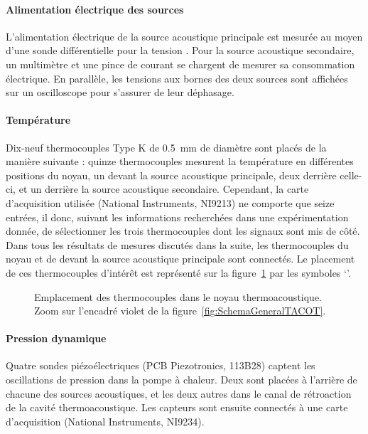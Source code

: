 \paragraph*{Alimentation électrique des sources} L'alimentation électrique de la source acoustique principale est mesurée au moyen d'une sonde différentielle pour la tension . Pour la source acoustique secondaire, un multimètre et une pince de courant se chargent de mesurer sa consommation électrique. En parallèle, les tensions aux bornes des deux sources sont affichées sur un oscilloscope pour s'assurer de leur déphasage.

\paragraph*{Température} Dix-neuf thermocouples Type K de \qty{.5}{\milli\meter} de diamètre sont placés de la manière suivante : quinze thermocouples mesurent la température en différentes positions du noyau, un devant la source acoustique principale, deux derrière celle-ci, et un derrière la source acoustique secondaire. Cependant, la carte d'acquisition utilisée (National Instruments, NI9213) ne comporte que seize entrées, il  donc, suivant les informations recherchées dans une expérimentation donnée, de sélectionner les trois thermocouples dont les signaux sont mis de côté. Dans tous les résultats de mesures discutés dans la suite, les thermocouples du noyau et de devant la source acoustique principale sont connectés. Le placement de ces thermocouples d'intérêt est représenté sur la figure~\ref{fig:TCdansNoyau} par les symboles `\textcolor{cyan}{\textbullet}'.

\begin{figure}[!ht]
    \centering
    
    \caption{Emplacement des thermocouples dans le noyau thermoacoustique. Zoom sur l'encadré violet de la figure~\ref{fig:SchemaGeneralTACOT}.}
    \label{fig:TCdansNoyau}
\end{figure}

\paragraph*{Pression dynamique} Quatre sondes piézoélectriques (PCB Piezotronics, 113B28) captent les oscillations de pression dans la pompe à chaleur. Deux sont placées à l'arrière de chacune des sources acoustiques, et les deux autres dans le canal de rétroaction de la cavité thermoacoustique. Les capteurs sont ensuite connectés à une carte d'acquisition (National Instruments, NI9234). 

